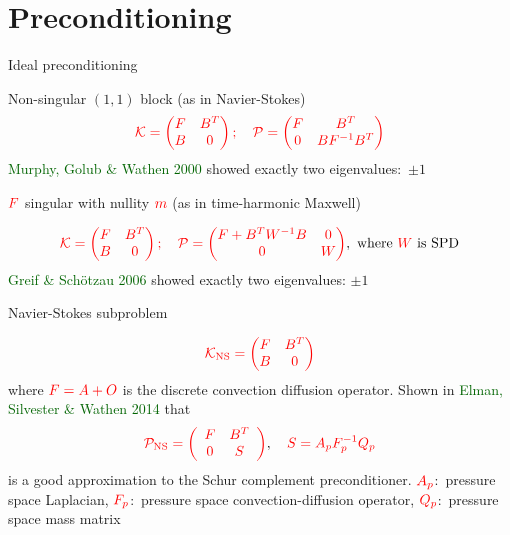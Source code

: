 \documentclass[12pt]{beamer}
\newcommand{\gr}[1]{\textcolor{darkgreen} {#1}}
\newcommand{\re}[1]{{\textcolor{red}       {#1}}}
\begin{document}
\section{Preconditioning}


\begin{frame}{Ideal preconditioning}

Non-singular $(1,1)$ block (as in Navier-Stokes)
\begin{equation}\nonumber
\re{\mathcal{K} = \begin{pmatrix}
F & B^T \\
B & 0
\end{pmatrix}; \quad
\mathcal{P}=\begin{pmatrix}
F & B^T\\
0 & B F^{-1} B^T
\end{pmatrix}}
\end{equation}
\gr{Murphy, Golub \& Wathen 2000} showed exactly two eigenvalues:~$\pm 1$ %

\vspace{5mm}
\pause
$\re{F}$ singular with nullity $\re{m}$ (as in time-harmonic Maxwell)

\begin{equation}\nonumber
\re{\mathcal{K} = \begin{pmatrix}
F & B^T \\
B & 0
\end{pmatrix}; \quad
\mathcal{P}=\begin{pmatrix}
F+B^T W^{-1} B & 0 \\
0 & W
\end{pmatrix}}, \ \mbox{where $\re{W}$ is SPD}
\end{equation}
\gr{Greif \& Sch{\"o}tzau 2006} showed exactly two eigenvalues: $\pm 1$

\end{frame}

\begin{frame}{Navier-Stokes subproblem}

$$\re{\mathcal{K}_{\rm NS}=\begin{pmatrix}
F & B^T \\
B & 0
\end{pmatrix}}$$
where $\re{F=A+O}$ is the discrete convection diffusion operator. Shown in \gr{Elman, Silvester \& Wathen 2014} that
$$\re{\mathcal{P}_{\rm NS}=\left(\begin{array}{cc}
F & B^T \\
0 & S
\end{array}\right)}, \quad \re{S =A_p F_p^{-1}Q_p}$$
is a good approximation to the Schur complement preconditioner. $\re{A_p}$:~pressure space Laplacian, $\re{F_p}$:~pressure space convection-diffusion operator, $\re{Q_p}$:~pressure space mass matrix
\end{frame}
\end{document}
